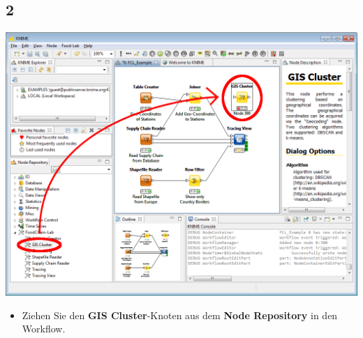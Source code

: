 \documentclass{beamer}
\begin{document}
\subsection{2}
\begin{frame}
	\begin{center}
  		\includegraphics[height=0.6\textheight]{2.png}
	\end{center}
	\begin{itemize}
		\item Ziehen Sie den \textbf{GIS Cluster}-Knoten aus dem \textbf{Node Repository} in den Workflow.
	\end{itemize}
\end{frame}
\end{document}
